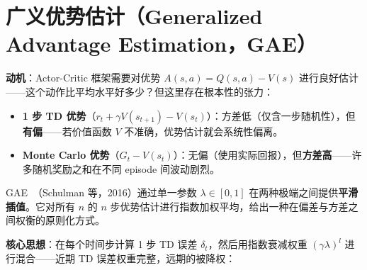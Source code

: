 \section{广义优势估计（Generalized Advantage Estimation，GAE）}
\label{generalized-advantage-estimation-gae}
\label{gae-generalised-advantage-estimation}

\textbf{动机}：Actor-Critic 框架需要对优势 $A(s,a) = Q(s,a) - V(s)$ 进行良好估计——这个动作比平均水平好多少？但这里存在根本性的张力：

\begin{itemize}
  \item \textbf{1 步 TD 优势}（$r_t + \gamma V(s_{t+1}) - V(s_t)$）：方差低（仅含一步随机性），但\textbf{有偏}——若价值函数 $V$ 不准确，优势估计就会系统性偏离。
  \item \textbf{Monte Carlo 优势}（$G_t - V(s_t)$）：无偏（使用实际回报），但\textbf{方差高}——许多随机奖励之和在不同 episode 间波动剧烈。
\end{itemize}

GAE~\cite{schulman2016high}（Schulman 等，2016）通过单一参数 $\lambda \in [0, 1]$ 在两种极端之间提供\textbf{平滑插值}。它对所有 $n$ 的 $n$ 步优势估计进行指数加权平均，给出一种在偏差与方差之间权衡的原则化方式。

\textbf{核心思想}：在每个时间步计算 1 步 TD 误差 $\delta_t$，然后用指数衰减权重 $(\gamma\lambda)^l$ 进行混合——近期 TD 误差权重完整，远期的被降权：

